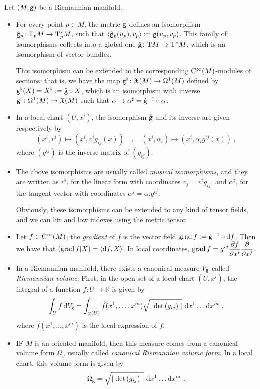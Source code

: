 \documentclass[12pt]{report}
\def\dst{\displaystyle}
\def\vf{\mathfrak X}
\def\d{{\rm d}}
\def\Real{\mathbb{R}}
\def\Tan{{\rm T}}
\def\Cinfty{{\rm C}^\infty}
\begin{document}
Let $(M,{\tt g})$ be a Riemannian manifold.
\begin{itemize}
  \item 
For every point $p\in M$, the metric ${\tt g}$ defines an isomorphism
$\hat{\tt g}_p\colon\Tan_pM\to\Tan_p^*M$, such that
$\langle\hat{\tt g}_p(u_p),v_p\rangle:={\tt g}(u_p,v_p)$. 
This family of isomorphisms collects into a global one
$\hat{\tt g}\colon\Tan M\to\Tan^*M$, 
which is an isomorphism of vector bundles.

This isomorphism can be extended to the corresponding 
$\Cinfty(M)$-modules of sections; that is, we have the map
${\tt g}^\flat\colon\vf(M)\to\Omega^1(M)$ defined by
${\tt g}^\flat(X)=X^\flat:=\hat{\tt g}\circ X$,
which is an isomorphism with inverse 
${\tt g}^\sharp\colon\Omega^1(M)\to\vf(M)$ such that
$\alpha\mapsto\alpha^\sharp=\hat{\tt g}^{-1}\circ\alpha$. 
\item 
In a local chart $(U,x^i)$, the isomorphism $\hat{\tt g}$ 
and its inverse are given respectively by
$$ 
(x^i,v^i)\mapsto (x^i, v^ig_{ij}(x))\quad ,\quad
(x^i,\alpha_i)\mapsto(x^i, \alpha_i g^{ij}(x)) \ ,
$$ 
where $(g^{ij})$ is the inverse matrix of $(g_{ij})$.
\item
The above isomorphisms are usually called 
{\sl musical isomorphisms}, and they are written as 
$v^\flat$, for the linear form with coordinates $v_j=v^ig_{ij}$, 
and $\alpha^\sharp$, for the tangent vector with coordinates 
$\alpha^j= \alpha_i g^{ij}$. 

Obviously, these isomorphisms can be extended to any kind of tensor fields, and we can lift and low indexes using the metric tensor.
\item
Let $f\in\Cinfty(M)$; the {\sl gradient} of $f$ 
is the vector field ${\rm grad}\,f:=\hat{{\tt g}}^{-1}\circ\d f$. 
Then we have that $({\rm grad}\, f|X)=\langle\d f,X\rangle$.
In local coordinates, 
$\dst{\rm grad}\,f=g^{ij}\frac{\partial f}{\partial x^i}\frac{\partial}{\partial x^j}$.
\item 
In a Riemannian manifold, there exists a canonical measure $V_{\tt g}$ 
called {\sl Riemannian volume}. 
First, in the open set of a local chart $(U,x^i)$, 
the integral of a function $f\colon U\to \Real$ is given by
$$
\int_U f\,\d V_{\tt g}=\int_{\varphi(U)}\hat{f}(x^1,\ldots,x^m)\sqrt{{\mid\det\,(g_{ij})}\mid}\,\,\d x^1\ldots\d x^m\ ,
$$
where $\hat{f}(x^1,\ldots,x^m)$ is the local expression of $f$.
\item
IF $M$ is an oriented manifold, then this measure comes from 
a canonical volume form $\Omega_g$ usually called 
{\sl canonical Riemannian volume form}. 
In a local chart, this volume form is given by  
$$
\Omega_{\tt g}=\sqrt{{\mid\det\,(g_{ij})}\mid}\ \d x^1\ldots\d x^m \ .
$$
\end{itemize}
\end{document}
